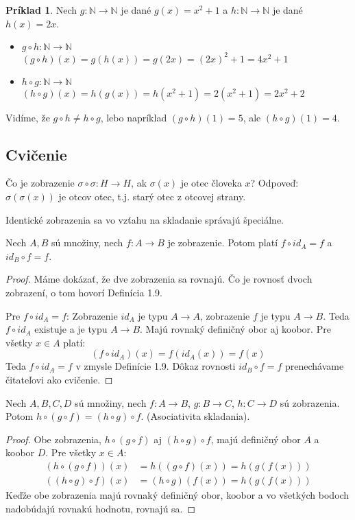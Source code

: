 \documentclass{article}
\theoremstyle{definition}
\newtheorem{example}{Príklad}
\theoremstyle{plain}
\theoremstyle{remark}
\begin{document}
\begin{example}
Nech $g \colon \mathbb{N} \rightarrow \mathbb{N}$ je dané $g(x) = x^2+1$ a $h \colon \mathbb{N} \rightarrow \mathbb{N}$ je dané $h(x) = 2x$.
\begin{itemize}
    \item $g \circ h \colon \mathbb{N} \rightarrow \mathbb{N}$ \\
    $(g \circ h)(x) = g(h(x)) = g(2x) = (2x)^2+1 = 4x^2+1$
    \item $h \circ g \colon \mathbb{N} \rightarrow \mathbb{N}$ \\
    $(h \circ g)(x) = h(g(x)) = h(x^2+1) = 2(x^2+1) = 2x^2+2$
\end{itemize}
Vidíme, že $g \circ h \neq h \circ g$, lebo napríklad $(g \circ h)(1) = 5$, ale $(h \circ g)(1) = 4$.
\end{example}

\subsection*{Cvičenie}
Čo je zobrazenie $\sigma \circ \sigma \colon H \rightarrow H$, ak $\sigma(x)$ je otec človeka $x$?
Odpoveď: $\sigma(\sigma(x))$ je otcov otec, t.j. starý otec z otcovej strany.

Identické zobrazenia sa vo vzťahu na skladanie správajú špeciálne.

\begin{tvrdenie}[1.10]
Nech $A, B$ sú množiny, nech $f \colon A \rightarrow B$ je zobrazenie. Potom platí $f \circ id_A = f$ a $id_B \circ f = f$.
\end{tvrdenie}

\begin{proof}
Máme dokázať, že dve zobrazenia sa rovnajú. Čo je rovnosť dvoch zobrazení, o tom hovorí Definícia 1.9.

Pre $f \circ id_A = f$:
Zobrazenie $id_A$ je typu $A \rightarrow A$, zobrazenie $f$ je typu $A \rightarrow B$.
Teda $f \circ id_A$ existuje a je typu $A \rightarrow B$. Majú rovnaký definičný obor aj koobor.
Pre všetky $x \in A$ platí:
$$ (f \circ id_A)(x) = f(id_A(x)) = f(x) $$
Teda $f \circ id_A = f$ v zmysle Definície 1.9.
Dôkaz rovnosti $id_B \circ f = f$ prenechávame čitateľovi ako cvičenie.
\end{proof}

\begin{tvrdenie}[1.11]
Nech $A, B, C, D$ sú množiny, nech $f \colon A \rightarrow B$, $g \colon B \rightarrow C$, $h \colon C \rightarrow D$ sú zobrazenia. Potom $h \circ (g \circ f) = (h \circ g) \circ f$. (Asociativita skladania).
\end{tvrdenie}

\begin{proof}
Obe zobrazenia, $h \circ (g \circ f)$ aj $(h \circ g) \circ f$, majú definičný obor $A$ a koobor $D$.
Pre všetky $x \in A$:
\begin{align*}
    (h \circ (g \circ f))(x) &= h((g \circ f)(x)) = h(g(f(x))) \\
    ((h \circ g) \circ f)(x) &= (h \circ g)(f(x)) = h(g(f(x)))
\end{align*}
Keďže obe zobrazenia majú rovnaký definičný obor, koobor a vo všetkých bodoch nadobúdajú rovnakú hodnotu, rovnajú sa.
\end{proof}
\end{document}
